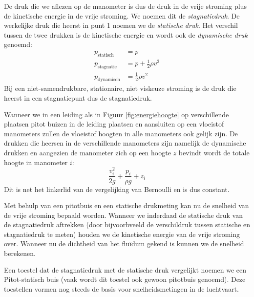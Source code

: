 De druk die we aflezen op de manometer is dus de druk in de vrije stroming plus de kinetische energie in de vrije stroming. We noemen dit de \emph{stagnatiedruk}. De werkelijke druk die heerst in punt 1 noemen we de \emph{statische druk}. Het verschil tussen de twee drukken is de kinetische energie en wordt ook de \emph{dynamische druk} genoemd:
\begin{align}
	p_\mathrm{statisch}  &= p \\
	p_\mathrm{stagnatie} &= p + \frac{1}{2} \rho v^2 \\
	p_\mathrm{dynamisch} &= \frac{1}{2} \rho v^2
\end{align}
Bij een niet-samendrukbare, stationaire, niet viskeuze stroming is de druk die heerst in een stagnatiepunt dus de stagnatiedruk.

Wanneer we in een leiding als in Figuur \ref{fig:energiehoogte} op verschillende plaatsen pitot buizen in de leiding plaatsen en aansluiten op een vloeistof manometers zullen de vloeistof hoogten in alle manometers ook gelijk zijn. De drukken die heersen in de verschillende manometers zijn namelijk de dynamische drukken en aangezien de manometer zich op een hoogte $z$ bevindt wordt de totale hoogte in manometer $i$:
\begin{equation}
	\frac{v_i^2}{2 g} + \frac{p_i}{\rho g} + z_i
\end{equation}
Dit is net het linkerlid van de vergelijking van Bernoulli en is dus constant.

Met behulp van een pitotbuis en een statische drukmeting kan nu de snelheid van de vrije stroming bepaald worden. Wanneer we inderdaad de statische druk van de stagnatiedruk aftrekken (door bijvoorbveeld de verschildruk tussen statische en stagnatiedruk te meten) houden we de kinetische energie van de vrije stroming over. Wanneer nu de dichtheid van het fluïdum gekend is kunnen we de snelheid berekenen.

Een toestel dat de stagnatiedruk met de statische druk vergelijkt noemen we een Pitot-statisch buis (vaak wordt dit toestel ook gewoon pitotbuis genoemd). Deze toestellen vormen nog steeds de basis voor snelheidsmetingen in de luchtvaart. 


